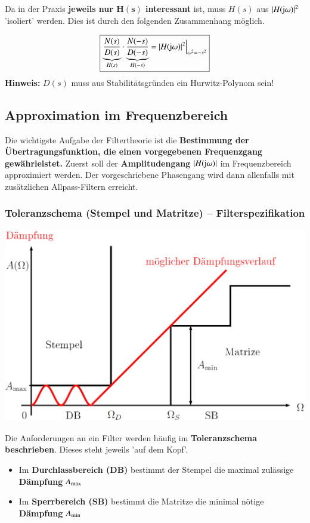 \vspace{0.2cm}

Da in der Praxis \textbf{jeweils nur $\bm{H(s)}$ interessant} ist, muss $H(s)$ aus $| H(\mathrm{j} \omega) |^2$ 'isoliert' werden. 
Dies ist durch den folgenden Zusammenhang möglich.

$$ \boxed{ \underbrace{ \frac{N(s)}{D(s)} }_{H(s)} \cdot  \underbrace{ \frac{N(-s)}{D(-s)} }_{H(-s)} = | H(\mathrm{j} \omega) |^2 \Big|_{\omega^2 = -s^2} } $$
\textbf{Hinweis:} $D(s)$ muss aus Stabilitätsgründen ein Hurwitz-Polynom sein!


\subsection{Approximation im Frequenzbereich}

Die wichtigste Aufgabe der Filtertheorie ist die \textbf{Bestimmung der Übertragungsfunktion, die einen vorgegebenen 
Frequenzgang gewährleistet.} Zuerst soll der \textbf{Amplitudengang} $| H(\mathrm{j} \omega) |$ im Frequenzbereich approximiert werden.
Der vorgeschriebene Phasengang wird dann allenfalls mit zusätzlichen Allpass-Filtern erreicht. 


\subsubsection{Toleranzschema (Stempel und Matritze) -- Filterspezifikation}
\label{Toleranzschema}

\begin{minipage}[c]{0.48\columnwidth}
    \includegraphics[width=\columnwidth]{images/filter_toleranzschema.png}
\end{minipage}
\hfill
\begin{minipage}[c]{0.48\columnwidth}
    Die Anforderungen an ein Filter werden häufig im \textbf{Toleranzschema beschrieben}. Dieses steht jeweils 'auf dem Kopf'.

    \begin{itemize}
        \item Im \textbf{Durchlassbereich (DB)} bestimmt der Stempel die maximal zulässige \textbf{Dämpfung} $A_{\rm max}$
        \item Im \textbf{Sperrbereich (SB)} bestimmt die Matritze die minimal nötige \textbf{Dämpfung} $A_{\rm min}$
    \end{itemize}
\end{minipage}

